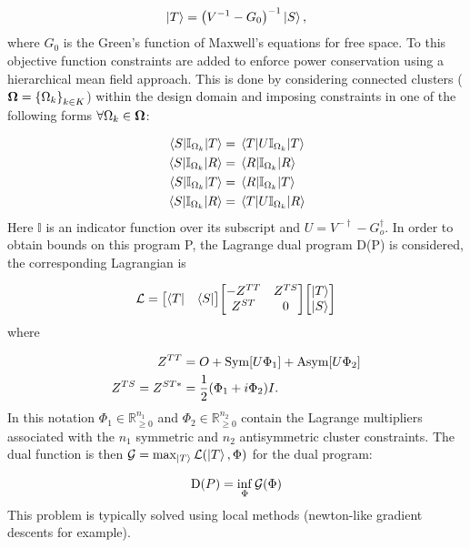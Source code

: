 \documentclass[reprint]{revtex4-2}
\newcommand{\sym}[1]{\text{Sym}\qty[#1]}
\newcommand{\asym}[1]{\text{Asym}\qty[#1]}
\begin{document}
\begin{align}
	\ket{T} = \qty(V^{-1} - G_0)^{-1}\ket{S},
\end{align}
where $G_0$ is the Green's function of Maxwell's equations for free space. To this objective function constraints are added to enforce power conservation using a hierarchical mean field approach\cite{molesky2020hierarchical}. This is done by considering connected clusters ($\vb{\Omega} = \qty{\Omega_k}_{k\in K}$) within the design domain and imposing constraints in one of the following forms $\forall \Omega_k\in\vb{\Omega}$:

\begin{align}
	\mel{S}{\mathbb{I}_{\Omega_k}}{T} &= \mel{T}{U\mathbb{I}_{\Omega_k}}{T}\\
	\mel{S}{\mathbb{I}_{\Omega_k}}{R} &= \mel{R}{\mathbb{I}_{\Omega_k}}{R}\\
	\mel{S}{\mathbb{I}_{\Omega_k}}{T} &= \mel{R}{\mathbb{I}_{\Omega_k}}{T}\\
	\mel{S}{\mathbb{I}_{\Omega_k}}{R} &= \mel{T}{U\mathbb{I}_{\Omega_k}}{R}
\end{align}
Here $\mathbb{I}$ is an indicator function over its subscript and $U=V^{-\dagger}-G_o^\dagger$. In order to obtain bounds on this program P, the Lagrange dual program D(P) is considered, the corresponding Lagrangian is

\begin{align}
	\mathcal{L} = \mqty[\bra{T} & \bra{S}]\mqty[-Z^{TT} & Z^{TS} \\ Z^{ST} & 0]\mqty[\ket{T} \\ \ket{S}]
\end{align}
where

\begin{align}
	Z^{TT} &= O + \sym{U\Phi_1} + \asym{U\Phi_2}\\
	Z^{TS} = Z^{ST*} &= \frac{1}{2}\qty(\Phi_1 + i\Phi_2)I.
\end{align}
In this notation $\Phi_1 \in \mathbb{R}_{\ge 0}^{n_1}$ and $\Phi_2 \in \mathbb{R}_{\ge 0}^{n_2}$ contain the Lagrange multipliers associated with the $n_1$ symmetric and $n_2$ antisymmetric cluster constraints. The dual function is then $\mathcal{G} = \max_{\ket{T}}\mathcal{L}\qty(\ket{T}, \Phi)$ for the dual program:

\begin{align}
	\text{D}\qty(P) = \inf_{\Phi} \mathcal{G}(\Phi)
\end{align}
This problem is typically solved using local methods (newton-like gradient descents for example). 
\end{document}
